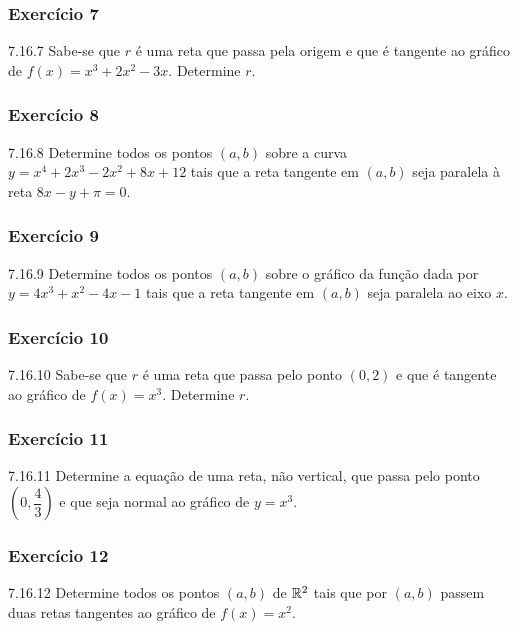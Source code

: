 \subsubsection*{Exercício 7}
\begin{exercicio}[7]{7.16.7}
Sabe-se que $r$ é uma reta que passa pela origem e que é tangente ao gráfico de $f(x) = x^3 + 2x^2 - 3x$. Determine $r$.
\end{exercicio}

\subsubsection*{Exercício 8}
\begin{exercicio}[8]{7.16.8}
Determine todos os pontos $(a, b)$ sobre a curva $y = x^4 + 2x^3 - 2x^2 + 8x + 12$ tais que a reta tangente em $(a, b)$ seja paralela à reta $8x - y + \pi = 0$.
\end{exercicio}

\subsubsection*{Exercício 9}
\begin{exercicio}[9]{7.16.9}
Determine todos os pontos $(a, b)$ sobre o gráfico da função dada por $y = 4x^3 + x^2 - 4x - 1$ tais que a reta tangente em $(a, b)$ seja paralela ao eixo $x$.
\end{exercicio}

\subsubsection*{Exercício 10}
\begin{exercicio}[10]{7.16.10}
Sabe-se que $r$ é uma reta que passa pelo ponto $(0, 2)$ e que é tangente ao gráfico de $f(x) = x^3$. Determine $r$.
\end{exercicio}

\subsubsection*{Exercício 11}
\begin{exercicio}[11]{7.16.11}
Determine a equação de uma reta, não vertical, que passa pelo ponto $\left(0, \dfrac{4}{3}\right)$ e que seja normal ao gráfico de $y = x^3$.
\end{exercicio}

\subsubsection*{Exercício 12}
\begin{exercicio}[12]{7.16.12}
Determine todos os pontos $(a, b)$ de $\mathbb{R}^2$ tais que por $(a, b)$ passem duas retas tangentes ao gráfico de $f(x) = x^2$.
\end{exercicio}

